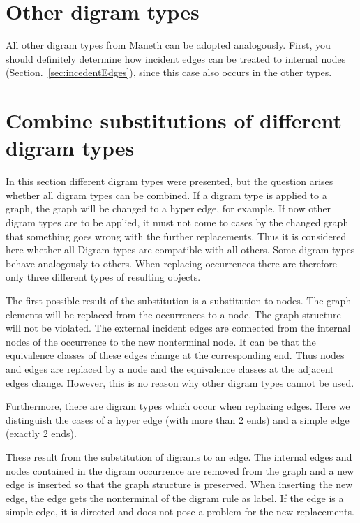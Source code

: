 \documentclass[a4paper]{scrartcl}
\begin{document}
\section{Other digram types}
All other digram types from Maneth can be adopted analogously. First, you should definitely determine how incident edges can be treated to internal nodes (Section.~\ref{sec:incedentEdges}), since this case also occurs in the other types.


\pagebreak
\section{Combine substitutions of different digram types}
In this section different digram types were presented, but the question arises whether all digram types can be combined. If a digram type is applied to a graph, the graph will be changed to a hyper edge, for example. If now other digram types are to be applied, it must not come to cases by the changed graph that something goes wrong with the further replacements. Thus it is considered here whether all Digram types are compatible with all others.
Some digram types behave analogously to others. When replacing occurrences there are therefore only three different types of resulting objects. 

The first possible result of the substitution is a substitution to nodes. The graph elements will be replaced from the occurrences to a node. The graph structure will not be violated. The external incident edges are connected from the internal nodes of the occurrence to the new nonterminal node. It can be that the equivalence classes of these edges change at the corresponding end. Thus nodes and edges are replaced by a node and the equivalence classes at the adjacent edges change. However, this is no reason why other digram types cannot be used.


Furthermore, there are digram types which occur when replacing edges. Here we distinguish the cases of a hyper edge (with more than 2 ends) and a simple edge (exactly 2 ends).

These result from the substitution of digrams to an edge. The internal edges and nodes contained in the digram occurrence are removed from the graph and a new edge is inserted so that the graph structure is preserved. When inserting the new edge, the edge gets the nonterminal of the digram rule as label. If the edge is a simple edge, it is directed and does not pose a problem for the new replacements.
\end{document}
